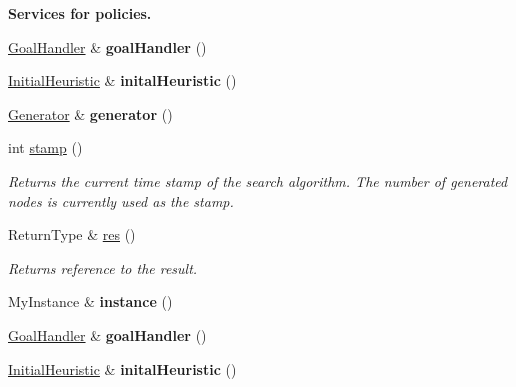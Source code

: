 \begin{Indent}{\bf Services for policies.}
\begin{DoxyCompactItemize}
\item 
\hyperlink{structalgorithm_1_1Algorithm_af9111b0a505a193a2c4878b710b8ea65}{Goal\+Handler} \& {\bfseries goal\+Handler} ()\hypertarget{structalgorithm_1_1Algorithm_a08254355b494b271e46bee2ceb6d3947}{}\label{structalgorithm_1_1Algorithm_a08254355b494b271e46bee2ceb6d3947}

\item 
\hyperlink{structalgorithm_1_1Algorithm_aa0c111908e844c0ff5cfe78f778bba52}{Initial\+Heuristic} \& {\bfseries inital\+Heuristic} ()\hypertarget{structalgorithm_1_1Algorithm_a7a1d2a064257f7ea9fb45eb8130f66cd}{}\label{structalgorithm_1_1Algorithm_a7a1d2a064257f7ea9fb45eb8130f66cd}

\item 
\hyperlink{structalgorithm_1_1Algorithm_a4b5d0c94b49b586bd31af92ed6ec94ad}{Generator} \& {\bfseries generator} ()\hypertarget{structalgorithm_1_1Algorithm_a5d672b3ffbb4d7ed627d21b8840255cb}{}\label{structalgorithm_1_1Algorithm_a5d672b3ffbb4d7ed627d21b8840255cb}

\item 
int \hyperlink{structalgorithm_1_1Algorithm_a8397b85b3f810d007bfb82a4aafa2dcf}{stamp} ()
\begin{DoxyCompactList}\small\item\em Returns the current time stamp of the search algorithm. The number of generated nodes is currently used as the stamp. \end{DoxyCompactList}\item 
Return\+Type \& \hyperlink{structalgorithm_1_1Algorithm_a247e95d77c29e1984ece6cd33368071c}{res} ()
\begin{DoxyCompactList}\small\item\em Returns reference to the result. \end{DoxyCompactList}\item 
My\+Instance \& {\bfseries instance} ()\hypertarget{structalgorithm_1_1Algorithm_adb72eaefc777f83c004d2f1e3bc228d1}{}\label{structalgorithm_1_1Algorithm_adb72eaefc777f83c004d2f1e3bc228d1}

\item 
\hyperlink{structalgorithm_1_1Algorithm_af9111b0a505a193a2c4878b710b8ea65}{Goal\+Handler} \& {\bfseries goal\+Handler} ()\hypertarget{structalgorithm_1_1Algorithm_a08254355b494b271e46bee2ceb6d3947}{}\label{structalgorithm_1_1Algorithm_a08254355b494b271e46bee2ceb6d3947}

\item 
\hyperlink{structalgorithm_1_1Algorithm_aa0c111908e844c0ff5cfe78f778bba52}{Initial\+Heuristic} \& {\bfseries inital\+Heuristic} ()\hypertarget{structalgorithm_1_1Algorithm_a7a1d2a064257f7ea9fb45eb8130f66cd}{}\label{structalgorithm_1_1Algorithm_a7a1d2a064257f7ea9fb45eb8130f66cd}


\end{DoxyCompactItemize}
\end{Indent}
